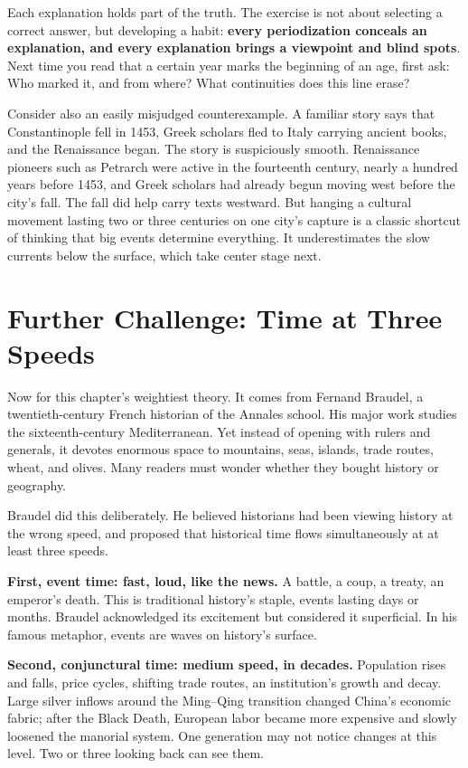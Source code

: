 Each explanation holds part of the truth. The exercise is not about selecting a correct answer, but developing a habit: \textbf{every periodization conceals an explanation, and every explanation brings a viewpoint and blind spots}. Next time you read that a certain year marks the beginning of an age, first ask: Who marked it, and from where? What continuities does this line erase?

Consider also an easily misjudged counterexample. A familiar story says that Constantinople fell in 1453, Greek scholars fled to Italy carrying ancient books, and the Renaissance began. The story is suspiciously smooth. Renaissance pioneers such as Petrarch were active in the fourteenth century, nearly a hundred years before 1453, and Greek scholars had already begun moving west before the city's fall. The fall did help carry texts westward. But hanging a cultural movement lasting two or three centuries on one city's capture is a classic shortcut of thinking that big events determine everything. It underestimates the slow currents below the surface, which take center stage next.

\section{Further Challenge: Time at Three Speeds}
Now for this chapter's weightiest theory. It comes from Fernand Braudel, a twentieth-century French historian of the Annales school. His major work studies the sixteenth-century Mediterranean. Yet instead of opening with rulers and generals, it devotes enormous space to mountains, seas, islands, trade routes, wheat, and olives. Many readers must wonder whether they bought history or geography.

Braudel did this deliberately. He believed historians had been viewing history at the wrong speed, and proposed that historical time flows simultaneously at at least three speeds.

\textbf{First, event time: fast, loud, like the news.} A battle, a coup, a treaty, an emperor's death. This is traditional history's staple, events lasting days or months. Braudel acknowledged its excitement but considered it superficial. In his famous metaphor, events are waves on history's surface.

\textbf{Second, conjunctural time: medium speed, in decades.} Population rises and falls, price cycles, shifting trade routes, an institution's growth and decay. Large silver inflows around the Ming--Qing transition changed China's economic fabric; after the Black Death, European labor became more expensive and slowly loosened the manorial system. One generation may not notice changes at this level. Two or three looking back can see them.

